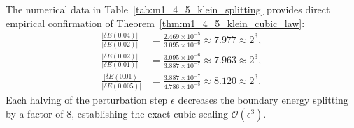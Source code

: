 \begin{table}[htbp]
\centering
\caption{Four-sublattice Klein duality finite-cell boundary splitting benchmark (\texttt{klein\_duality\_splitting.dat}).}
\label{tab:m1_4_5_klein_splitting}
\vspace{2mm}
\end{table}

The numerical data in Table~\ref{tab:m1_4_5_klein_splitting} provides direct empirical confirmation of Theorem~\ref{thm:m1_4_5_klein_cubic_law}:
\begin{align}
\frac{|\delta E(0.04)|}{|\delta E(0.02)|} &= \frac{2.469 \times 10^{-5}}{3.095 \times 10^{-6}} \approx 7.977 \approx 2^3, \\
\frac{|\delta E(0.02)|}{|\delta E(0.01)|} &= \frac{3.095 \times 10^{-6}}{3.887 \times 10^{-7}} \approx 7.963 \approx 2^3, \\
\frac{|\delta E(0.01)|}{|\delta E(0.005)|} &= \frac{3.887 \times 10^{-7}}{4.786 \times 10^{-8}} \approx 8.120 \approx 2^3.
\end{align}
Each halving of the perturbation step $\epsilon$ decreases the boundary energy splitting by a factor of 8, establishing the exact cubic scaling $\mathcal{O}(\epsilon^3)$.



